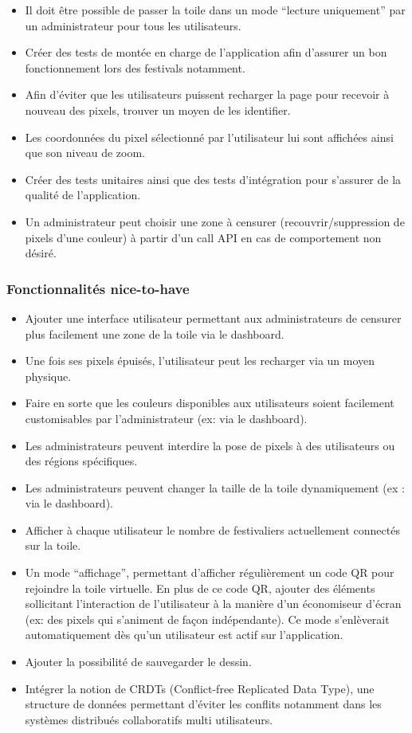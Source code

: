 \begin{itemize}
  \item Il doit être possible de passer la toile dans un mode “lecture uniquement” par un administrateur pour tous les utilisateurs.
  \item Créer des tests de montée en charge de l'application afin d'assurer un bon fonctionnement lors des festivals notamment.
  \item Afin d'éviter que les utilisateurs puissent recharger la page pour recevoir à nouveau des pixels, trouver un moyen de les identifier.
  \item Les coordonnées du pixel sélectionné par l'utilisateur lui sont affichées ainsi que son niveau de zoom.
  \item Créer des tests unitaires ainsi que des tests d'intégration pour s'assurer de la qualité de l'application.
  \item Un administrateur peut choisir une zone à censurer (recouvrir/suppression de pixels d'une couleur) à partir d'un call API en cas de comportement non désiré.
\end{itemize}

\subsubsection{Fonctionnalités \guillemotleft nice-to-have\guillemotright}

\begin{itemize}
  \item Ajouter une interface utilisateur permettant aux administrateurs de censurer plus facilement une zone de la toile via le dashboard.
  \item Une fois ses pixels épuisés, l'utilisateur peut les recharger via un moyen physique.
  \item Faire en sorte que les couleurs disponibles aux utilisateurs soient facilement customisables par l'administrateur (ex: via le dashboard).
  \item Les administrateurs peuvent interdire la pose de pixels à des utilisateurs ou des régions spécifiques.
  \item Les administrateurs peuvent changer la taille de la toile dynamiquement (ex : via le dashboard).
  \item Afficher à chaque utilisateur le nombre de festivaliers actuellement connectés sur la toile.
  \item Un mode “affichage”, permettant d'afficher régulièrement un code QR pour rejoindre la toile virtuelle. En plus de ce code QR, ajouter des éléments sollicitant l'interaction de l'utilisateur à la manière d'un économiseur d'écran (ex: des pixels qui s'animent de façon indépendante). Ce mode s'enlèverait automatiquement dès qu'un utilisateur est actif sur l'application.
  \item Ajouter la possibilité de sauvegarder le dessin.
  \item Intégrer la notion de CRDTs (Conflict-free Replicated Data Type), une structure de données permettant d'éviter les conflits notamment dans les systèmes distribués collaboratifs multi utilisateurs.
\end{itemize}

